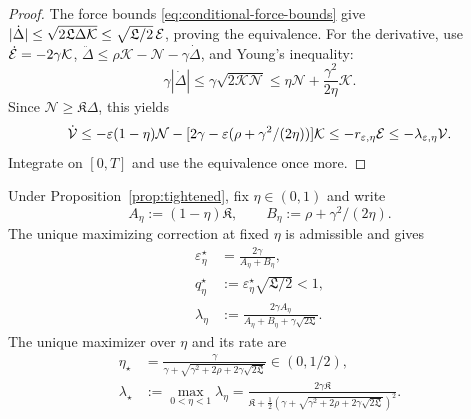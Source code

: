 \begin{proof}
The force bounds \eqref{eq:conditional-force-bounds} give
$|\dot\Delta|\le\sqrt{2\mathfrak L\Delta\mathcal{K}}
\le\sqrt{\mathfrak L/2}\,\mathcal E$, proving the equivalence.
For the derivative, use $\dot{\mathcal E}=-2\gamma\mathcal{K}$,
$\ddot\Delta\le\rho\mathcal{K}-\mathcal N-\gamma\dot\Delta$, and Young's inequality:
\begin{equation}\label{eq:tightened-momentum-parameterized-young}
 \gamma|\dot\Delta|\le\gamma\sqrt{2\mathcal{K}\mathcal N}
 \le\eta\mathcal N+\frac{\gamma^2}{2\eta}\mathcal{K}.
\end{equation}
Since $\mathcal N\ge\mathfrak K\Delta$, this yields
\[
 \dot{\mathcal V}
 \le-\varepsilon(1-\eta)\mathcal N
     -[2\gamma-\varepsilon(\rho+\gamma^2/(2\eta))]\mathcal{K}
 \le-r_{\varepsilon,\eta}\mathcal E
 \le-\lambda_{\varepsilon,\eta}\mathcal V.
\]
Integrate on $[0,T]$ and use the equivalence once more.
\end{proof}

\begin{proposition}
\label{prop:optimal-tightened-conditional-momentum-rate}
Under Proposition~\ref{prop:tightened}, fix $\eta\in(0,1)$ and write
\begin{equation}\label{eq:tightened-momentum-A-B-definition}
 A_\eta:=(1-\eta)\mathfrak K,\qquad
 B_\eta:=\rho+\gamma^2/(2\eta).
\end{equation}
The unique maximizing correction at fixed $\eta$ is admissible and gives
\begin{align}
 \varepsilon_\eta^\star&=\frac{2\gamma}{A_\eta+B_\eta},\label{eq:tightened-momentum-optimal-epsilon}\\
 q_\eta^\star&:=\varepsilon_\eta^\star\sqrt{\mathfrak L/2}<1,\label{eq:tightened-momentum-optimal-q}\\
 \lambda_\eta&:=\frac{2\gamma A_\eta}
 {A_\eta+B_\eta+\gamma\sqrt{2\mathfrak L}}.\label{eq:tightened-momentum-fixed-eta-rate}
\end{align}
The unique maximizer over $\eta$ and its rate are
\begin{align}
 \eta_\star&=\frac{\gamma}
 {\gamma+\sqrt{\gamma^2+2\rho+2\gamma\sqrt{2\mathfrak L}}}
 \in(0,1/2),\label{eq:tightened-momentum-optimal-eta}\\
 \lambda_\star&:=\max_{0<\eta<1}\lambda_\eta
 =\frac{2\gamma\mathfrak K}
 {\mathfrak K+\frac12
 (\gamma+\sqrt{\gamma^2+2\rho+2\gamma\sqrt{2\mathfrak L}})^2}.\label{eq:tightened-momentum-optimal-rate}
\end{align}
\end{proposition}

